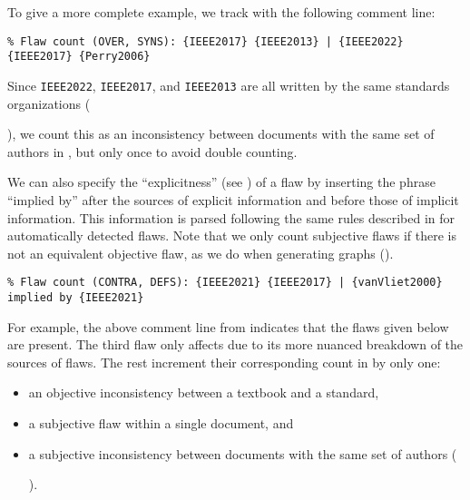 To give a more complete example, we track  with the
following comment line:\utd{}
\begin{displayquote}
    \texttt{\% Flaw count (OVER, SYNS): \{IEEE2017\} \{IEEE2013\} | \{IEEE2022\}
        \displayNL{} \{IEEE2017\} \{Perry2006\}}
\end{displayquote}%
Since \texttt{IEEE2022}, \texttt{IEEE2017}, and \texttt{IEEE2013} are all
written by the same standards
organizations (\begin{NoHyper}\citeauthor{IEEE2022}\end{NoHyper}), we count
this as an inconsistency between documents with the same set of authors in
, but only once to avoid double counting.

We can also specify the ``explicitness'' (see ) of a flaw by inserting
the phrase ``implied by'' after the sources of explicit information and before
those of implicit information. This information is parsed following the same
rules described in  for automatically
detected flaws. Note that we only count subjective flaws if there is not an
equivalent objective flaw, as we do when generating graphs ().
\begin{displayquote}
    \texttt{\% Flaw count (CONTRA, DEFS): \{IEEE2021\} \{IEEE2017\} |
        \displayNL \{vanVliet2000\} implied by \{IEEE2021\}}
\end{displayquote}
For example, the above comment line\utd{} from  indicates
that the flaws given below are present. The third flaw only affects
 due to its more nuanced breakdown of the
sources of flaws. The rest increment their corresponding count in
 by only one:
\begin{itemize}
    \item an objective inconsistency between a textbook and a standard,
    \item a subjective flaw within a single document, and
    \item a subjective inconsistency between documents with the same set of
          authors (\begin{NoHyper}\citeauthor{IEEE2022}\end{NoHyper}).
\end{itemize}

